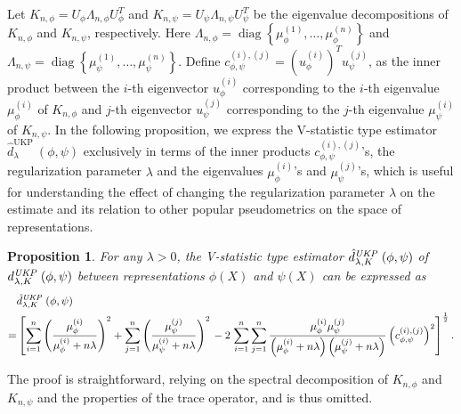 \documentclass[11pt]{article}
\newcommand{\repone}{\phi}
\newcommand{\reptwo}{\psi}
\newcommand{\metricstname}{UKP }
\theoremstyle{plain}
\newcounter{propositionno}
\newtheorem{proposition}[propositionno]{Proposition}
\begin{document}
Let $K_{n,\repone} = U_{\repone} \Lambda_{n,\repone}U_{\repone}^{T}$ and $K_{n,\reptwo} = U_{\reptwo} \Lambda_{n,\reptwo}U_{\reptwo}^{T}$ be the eigenvalue decompositions of $K_{n,\repone}$ and 
$K_{n,\reptwo}$, respectively. Here $\Lambda_{n,\repone} = \operatorname{diag}\left\{\mu_{\repone}^{(1)},\dots,\mu_{\repone}^{(n)}\right\}$ and $\Lambda_{n,\reptwo} = \operatorname{diag}\left\{\mu_{\reptwo}^{(1)},\dots,\mu_{\reptwo}^{(n)}\right\}$. Define $c_{\repone,\reptwo}^{(i),(j)} = \left(u_{\repone}^{(i)}\right)^{T}u_{\reptwo}^{(j)}$, as the inner product between the $i$-th eigenvector $u_{\repone}^{(i)}$ corresponding to the $i$-th eigenvalue $\mu_{\repone}^{(i)}$ of $K_{n,\repone}$ and $j$-th eigenvector $u_{\reptwo}^{(j)}$ corresponding to the $j$-th eigenvalue $\mu_{\reptwo}^{(i)}$  of $K_{n,\reptwo}$. In the following proposition, we express the V-statistic type estimator $\hat{d}_{\lambda}^{\text{\metricstname}}(\repone,\reptwo)$ exclusively in terms of the inner products $c_{\repone,\reptwo}^{(i),(j)}$'s, the regularization parameter $\lambda$ and the eigenvalues $\mu_{\repone}^{(i)}$'s and $\mu_{\reptwo}^{(j)}$'s, which is useful for understanding the effect of changing the regularization parameter $\lambda$ on the estimate and its relation to other popular pseudometrics on the space of representations.

\begin{proposition}\label{Proposition: Estimator in terms of eigenvalues and eigenvectors of Gram matrices}
    For any $\lambda>0$, the V-statistic type estimator $\hat{d}_{\lambda,K}^{\emph{\metricstname}}(\repone,\reptwo)$ of $d_{\lambda,K}^{\emph{\metricstname}}(\repone,\reptwo)$ between representations $\repone(X)$ and $\reptwo(X)$ can be expressed as
    \[
    \begin{aligned}
        &\hat{d}_{\lambda,K}^{\emph{\metricstname}}(\repone,\reptwo)\\
        =& \left[\sum_{i=1}^{n} \left(\frac{\mu_{\repone}^{(i)}}{\mu_{\repone}^{(i)}+ n\lambda}\right)^{2} + \sum_{j=1}^{n} \left(\frac{\mu_{\reptwo}^{(j)}}{\mu_{\reptwo}^{(i)}+ n\lambda}\right)^{2}\right.-2\left.\sum_{i=1}^{n}\sum_{j=1}^{n}\frac{\mu_{\repone}^{(i)}\mu_{\reptwo}^{(j)}}{\left(\mu_{\repone}^{(i)} + n\lambda\right)\left(\mu_{\reptwo}^{(j)} + n\lambda\right)}\left(c_{\repone,\reptwo}^{(i),(j)} \right)^{2}\right]^{\frac{1}{2}}.
    \end{aligned}
    \]
\end{proposition}

The proof is straightforward, relying on the spectral decomposition of $K_{n,\repone}$ and $K_{n,\reptwo}$ and the properties of the trace operator, and is thus omitted.
\end{document}
